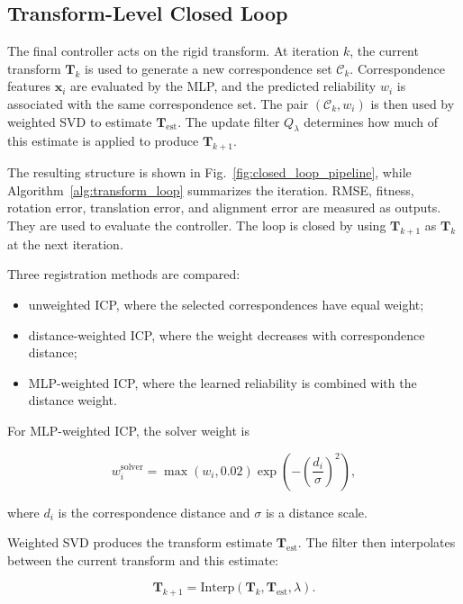 \documentclass[conference]{IEEEtran}
\newcommand{\T}{\bm{T}}
\newcommand{\C}{\mathcal{C}}
\newcommand{\x}{\bm{x}}
\newcommand{\Test}{\T_{\mathrm{est}}}
\begin{document}
\subsection{Transform-Level Closed Loop}
\label{subsec:transform_control}

The final controller acts on the rigid transform. At iteration $k$, the current transform $\T_k$ is used to generate a new correspondence set $\C_k$. Correspondence features $\x_i$ are evaluated by the MLP, and the predicted reliability $w_i$ is associated with the same correspondence set. The pair $(\C_k,w_i)$ is then used by weighted SVD to estimate $\Test$. The update filter $Q_\lambda$ determines how much of this estimate is applied to produce $\T_{k+1}$.

The resulting structure is shown in Fig.~\ref{fig:closed_loop_pipeline}, while Algorithm~\ref{alg:transform_loop} summarizes the iteration. RMSE, fitness, rotation error, translation error, and alignment error are measured as outputs. They are used to evaluate the controller. The loop is closed by using $\T_{k+1}$ as $\T_k$ at the next iteration.

Three registration methods are compared:
\begin{itemize}
    \item unweighted ICP, where the selected correspondences have equal weight;
    \item distance-weighted ICP, where the weight decreases with correspondence distance;
    \item MLP-weighted ICP, where the learned reliability is combined with the distance weight.
\end{itemize}

For MLP-weighted ICP, the solver weight is

\begin{equation}
    w_i^{\mathrm{solver}}
    =
    \max(w_i,0.02)
    \exp\left(-\left(\frac{d_i}{\sigma}\right)^2\right),
    \label{eq:solver_weight}
\end{equation}

where $d_i$ is the correspondence distance and $\sigma$ is a distance scale.

Weighted SVD produces the transform estimate $\Test$. The filter then interpolates between the current transform and this estimate:

\begin{equation}
    \T_{k+1}
    =
    \mathrm{Interp}
    \left(
    \T_k,
    \Test,
    \lambda
    \right).
    \label{eq:transform_filter}
\end{equation}
\end{document}
